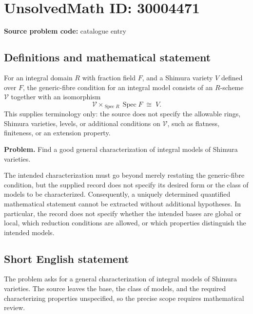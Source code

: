 \documentclass[11pt]{article}
\begin{document}
\section*{UnsolvedMath ID: 30004471}
\textbf{Source problem code:} catalogue entry
\subsection{Definitions and mathematical statement}
For an integral domain \(R\) with fraction field \(F\), and a Shimura variety \(V\) defined over \(F\), the generic-fibre condition for an integral model consists of an \(R\)-scheme \(\mathcal V\) together with an isomorphism
\[
\mathcal V\times_{\operatorname{Spec}R}\operatorname{Spec}F\;\cong\;V.
\]
This supplies terminology only: the source does not specify the allowable rings, Shimura varieties, levels, or additional conditions on \(\mathcal V\), such as flatness, finiteness, or an extension property.

\textbf{Problem.} Find a good general characterization of integral models of Shimura varieties.

The intended characterization must go beyond merely restating the generic-fibre condition, but the supplied record does not specify its desired form or the class of models to be characterized. Consequently, a uniquely determined quantified mathematical statement cannot be extracted without additional hypotheses. In particular, the record does not specify whether the intended bases are global or local, which reduction conditions are allowed, or which properties distinguish the intended models.
\subsection{Short English statement}
The problem asks for a general characterization of integral models of Shimura varieties. The source leaves the base, the class of models, and the required characterizing properties unspecified, so the precise scope requires mathematical review.
\end{document}
